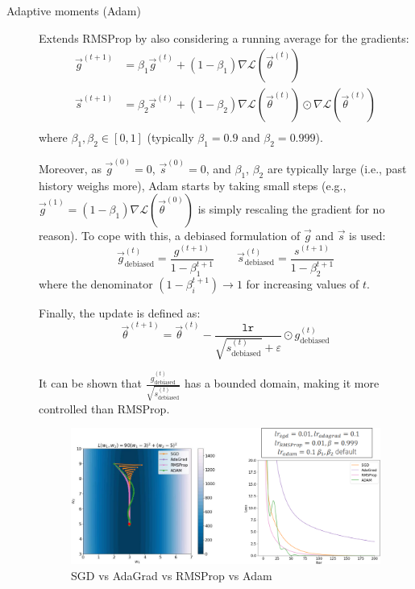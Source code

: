 \begin{description}
    \item[Adaptive moments (Adam)] 
        Extends RMSProp by also considering a running average for the gradients:
        \[
            \begin{split}
                \vec{g}^{(t+1)} &= \beta_1 \vec{g}^{(t)} + (1-\beta_1) \nabla\mathcal{L}(\vec{\theta}^{(t)}) \\
                \vec{s}^{(t+1)} &= \beta_2 \vec{s}^{(t)} + (1-\beta_2) \nabla\mathcal{L}(\vec{\theta}^{(t)}) \odot \nabla\mathcal{L}(\vec{\theta}^{(t)}) \\
            \end{split}
        \]
        where $\beta_1, \beta_2 \in [0, 1]$ (typically $\beta_1 = 0.9$ and $\beta_2 = 0.999$).

        Moreover, as $\vec{g}^{(0)} = 0$, $\vec{s}^{(0)} = 0$, and $\beta_1$, $\beta_2$ are typically large (i.e., past history weighs more), Adam starts by taking small steps (e.g., $\vec{g}^{(1)} = (1-\beta_1) \nabla\mathcal{L}(\vec{\theta}^{(0)})$ is simply rescaling the gradient for no reason). To cope with this, a debiased formulation of $\vec{g}$ and $\vec{s}$ is used:
        \[
            \vec{g}^{(t)}_{\text{debiased}} = \frac{g^{(t+1)}}{1-\beta_1^{t+1}} 
            \qquad
            \vec{s}^{(t)}_{\text{debiased}} = \frac{s^{(t+1)}}{1-\beta_2^{t+1}} 
        \]
        where the denominator $(1-\beta_i^{t+1}) \rightarrow 1$ for increasing values of $t$.

        Finally, the update is defined as:
        \[
            \vec{\theta}^{(t+1)} = \vec{\theta}^{(t)} - \frac{\texttt{lr}}{\sqrt{s^{(t)}_{\text{debiased}}} + \varepsilon} \odot g^{(t)}_{\text{debiased}}
        \]

        \begin{remark}
            It can be shown that $\frac{g^{(t)}_{\text{debiased}}}{\sqrt{s^{(t)}_{\text{debiased}}}}$ has a bounded domain, making it more controlled than RMSProp.
        \end{remark}

        \begin{figure}[H]
            \centering
            \includegraphics[width=0.75\linewidth]{./img/adam.png}
            \caption{SGD vs AdaGrad vs RMSProp vs Adam}
        \end{figure}


\end{description}
